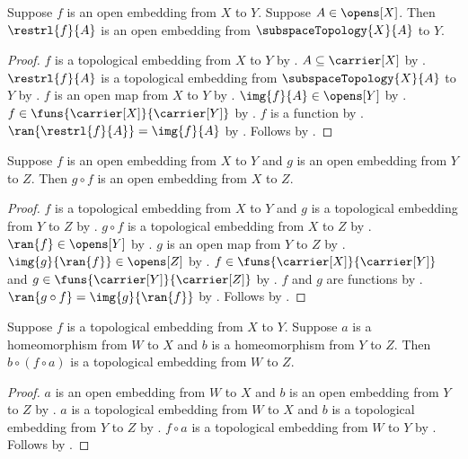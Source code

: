 \begin{theorem}\label{open_embedding_restriction}
    Suppose $f$ is an open embedding from $X$ to $Y$.
    Suppose $A\in\opens[X]$.
    Then $\restrl{f}{A}$ is an open embedding from
        $\subspaceTopology{X}{A}$ to $Y$.
\end{theorem}
\begin{proof}
    $f$ is a topological embedding from $X$ to $Y$ by .
    $A\subseteq\carrier[X]$ by .
    $\restrl{f}{A}$ is a topological embedding from
        $\subspaceTopology{X}{A}$ to $Y$ by
        .
    $f$ is an open map from $X$ to $Y$ by .
    $\img{f}{A}\in\opens[Y]$ by .
    $f\in\funs{\carrier[X]}{\carrier[Y]}$ by .
    $f$ is a function by .
    $\ran{\restrl{f}{A}}=\img{f}{A}$ by .
    Follows by .
\end{proof}

\begin{theorem}\label{open_embedding_composition}
    Suppose $f$ is an open embedding from $X$ to $Y$ and
        $g$ is an open embedding from $Y$ to $Z$.
    Then $g\circ f$ is an open embedding from $X$ to $Z$.
\end{theorem}
\begin{proof}
    $f$ is a topological embedding from $X$ to $Y$ and
        $g$ is a topological embedding from $Y$ to $Z$ by
        .
    $g\circ f$ is a topological embedding from $X$ to $Z$ by
        .
    $\ran{f}\in\opens[Y]$ by .
    $g$ is an open map from $Y$ to $Z$ by .
    $\img{g}{\ran{f}}\in\opens[Z]$ by .
    $f\in\funs{\carrier[X]}{\carrier[Y]}$ and
        $g\in\funs{\carrier[Y]}{\carrier[Z]}$ by
        .
    $f$ and $g$ are functions by .
    $\ran{g\circ f}=\img{g}{\ran{f}}$ by .
    Follows by .
\end{proof}

\begin{theorem}\label{topological_embedding_transport}
    Suppose $f$ is a topological embedding from $X$ to $Y$.
    Suppose $a$ is a homeomorphism from $W$ to $X$ and
        $b$ is a homeomorphism from $Y$ to $Z$.
    Then $b\circ(f\circ a)$ is a topological embedding from $W$ to $Z$.
\end{theorem}
\begin{proof}
    $a$ is an open embedding from $W$ to $X$ and
        $b$ is an open embedding from $Y$ to $Z$ by
        .
    $a$ is a topological embedding from $W$ to $X$ and
        $b$ is a topological embedding from $Y$ to $Z$ by
        .
    $f\circ a$ is a topological embedding from $W$ to $Y$ by
        .
    Follows by .
\end{proof}
